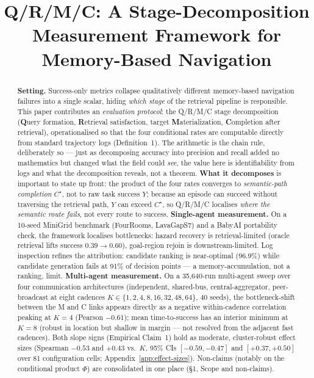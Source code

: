 \documentclass{article}
\title{Q/R/M/C: A Stage-Decomposition Measurement Framework for Memory-Based Navigation}
\begin{document}
\maketitle

\begin{abstract}
\textbf{Setting.} Success-only metrics collapse qualitatively different memory-based navigation failures into a single scalar, hiding \emph{which stage} of the retrieval pipeline is responsible. This paper contributes an \emph{evaluation protocol}: the Q/R/M/C stage decomposition (\textbf{Q}uery formation, \textbf{R}etrieval satisfaction, target \textbf{M}aterialization, \textbf{C}ompletion after retrieval), operationalised so that the four conditional rates are computable directly from standard trajectory logs (Definition~1). The arithmetic is the chain rule, deliberately so --- just as decomposing accuracy into precision and recall added no mathematics but changed what the field could \emph{see}, the value here is identifiability from logs and what the decomposition reveals, not a theorem. \textbf{What it decomposes} is important to state up front: the product of the four rates converges to \emph{semantic-path completion} $C^\star$, not to raw task success $Y$; because an episode can succeed without traversing the retrieval path, $Y$ can exceed $C^\star$, so Q/R/M/C localises \emph{where the semantic route fails}, not every route to success.
\textbf{Single-agent measurement.} On a 10-seed MiniGrid benchmark (FourRooms, LavaGapS7) and a BabyAI portability check, the framework localises bottlenecks: hazard recovery is retrieval-limited (oracle retrieval lifts success $0.39\to0.60$), goal-region rejoin is downstream-limited. Log inspection refines the attribution: candidate ranking is near-optimal ($96.9\%$) while candidate generation fails at 91\% of decision points --- a memory-accumulation, not a ranking, limit.
\textbf{Multi-agent measurement.} On a 35{,}640-run multi-agent sweep over four communication architectures (independent, shared-bus, central-aggregator, peer-broadcast at eight cadences $K{\in}\{1,2,4,8,16,32,48,64\}$, 40 seeds), the bottleneck-shift between the M and C links appears directly as a negative within-cadence correlation peaking at $K{=}4$ (Pearson $-0.61$); mean time-to-success has an interior minimum at $K{=}8$ (robust in location but shallow in margin --- not resolved from the adjacent fast cadences). Both slope signs (Empirical Claim~1) hold as moderate, cluster-robust effect sizes (Spearman $-0.53$ and $+0.43$ vs.\ $K$, 95\% CIs $[-0.59,-0.47]$ and $[+0.37,+0.50]$ over 81 configuration cells; Appendix~\ref{app:effect-sizes}). Non-claims (notably on the conditional product $\Phi$) are consolidated in one place (\S1, Scope and non-claims).

\end{abstract}
\end{document}

